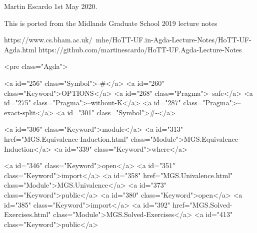 Martin Escardo 1st May 2020.

This is ported from the Midlands Graduate School 2019 lecture notes

 https://www.cs.bham.ac.uk/~mhe/HoTT-UF.in-Agda-Lecture-Notes/HoTT-UF-Agda.html
 https://github.com/martinescardo/HoTT-UF.Agda-Lecture-Notes

<pre class="Agda">

<a id="256" class="Symbol">{-#</a> <a id="260" class="Keyword">OPTIONS</a> <a id="268" class="Pragma">--safe</a> <a id="275" class="Pragma">--without-K</a> <a id="287" class="Pragma">--exact-split</a> <a id="301" class="Symbol">#-}</a>

<a id="306" class="Keyword">module</a> <a id="313" href="MGS.Equivalence-Induction.html" class="Module">MGS.Equivalence-Induction</a> <a id="339" class="Keyword">where</a>

<a id="346" class="Keyword">open</a> <a id="351" class="Keyword">import</a> <a id="358" href="MGS.Univalence.html" class="Module">MGS.Univalence</a> <a id="373" class="Keyword">public</a>
<a id="380" class="Keyword">open</a> <a id="385" class="Keyword">import</a> <a id="392" href="MGS.Solved-Exercises.html" class="Module">MGS.Solved-Exercises</a> <a id="413" class="Keyword">public</a>


